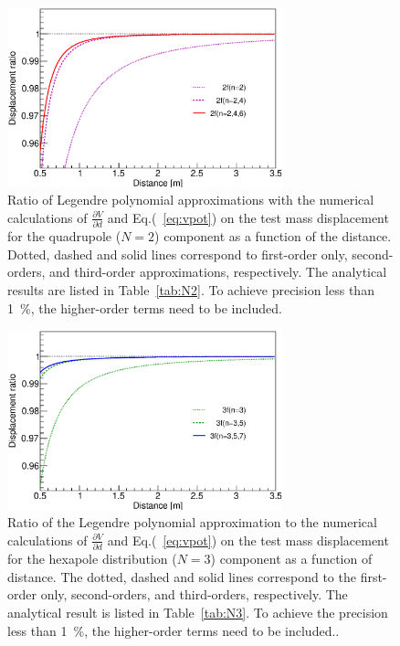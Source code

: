 \documentclass[%
 reprint,
superscriptaddress,
 amsmath,amssymb,
 aps,
]{revtex4-1}
\begin{document}
\begin{figure}
\begin{center}
\includegraphics[width=8cm]{2f.eps}
\caption{Ratio of Legendre polynomial approximations with the numerical calculations of $\frac{\partial V}{\partial{d}}$ and Eq.(~\ref{eq:vpot})
on the test mass displacement for the quadrupole ($N=2$) component as a function of the distance. Dotted, dashed and solid lines correspond to first-order only, second-orders, and third-order approximations, respectively.
The analytical results are listed in Table~\ref{tab:N2}. To achieve precision less than 1~\%, the higher-order terms need to be included.}
\label{fig:FEM-2f}
\end{center}
\end{figure}

\begin{figure}
\begin{center}
\includegraphics[width=8cm]{3f.eps}
\caption{Ratio of the Legendre polynomial approximation to the numerical calculations of $\frac{\partial V}{\partial{d}}$ and Eq.(~\ref{eq:vpot}) 
on the test mass displacement for the hexapole distribution ($N=3$) component as a function of distance. The dotted, dashed and solid lines correspond to the first-order only, second-orders, and third-orders, respectively.
The analytical result is listed in Table~\ref{tab:N3}. To achieve the precision less than 1~\%, the higher-order terms need to be included..}
\label{fig:FEM-3f}
\end{center}
\end{figure}
\end{document}
